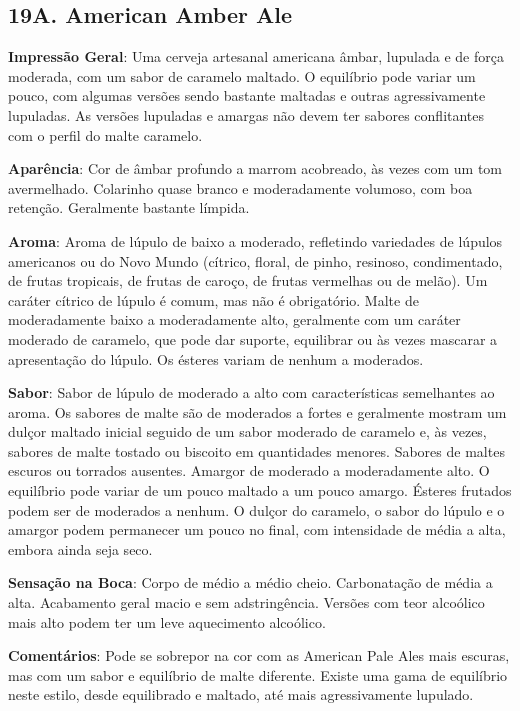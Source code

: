 \subsection*{19A. American Amber Ale}

\textbf{Impressão Geral}: Uma cerveja artesanal americana âmbar, lupulada e de força moderada, com um sabor de caramelo maltado. O equilíbrio pode variar um pouco, com algumas versões sendo bastante maltadas e outras agressivamente lupuladas. As versões lupuladas e amargas não devem ter sabores conflitantes com o perfil do malte caramelo.

\textbf{Aparência}: Cor de âmbar profundo a marrom acobreado, às vezes com um tom avermelhado. Colarinho quase branco e moderadamente volumoso, com boa retenção. Geralmente bastante límpida.

\textbf{Aroma}: Aroma de lúpulo de baixo a moderado, refletindo variedades de lúpulos americanos ou do Novo Mundo (cítrico, floral, de pinho, resinoso, condimentado, de frutas tropicais, de frutas de caroço, de frutas vermelhas ou de melão). Um caráter cítrico de lúpulo é comum, mas não é obrigatório. Malte de moderadamente baixo a moderadamente alto, geralmente com um caráter moderado de caramelo, que pode dar suporte, equilibrar ou às vezes mascarar a apresentação do lúpulo. Os ésteres variam de nenhum a moderados.

\textbf{Sabor}: Sabor de lúpulo de moderado a alto com características semelhantes ao aroma. Os sabores de malte são de moderados a fortes e geralmente mostram um dulçor maltado inicial seguido de um sabor moderado de caramelo e, às vezes, sabores de malte tostado ou biscoito em quantidades menores. Sabores de maltes escuros ou torrados ausentes. Amargor de moderado a moderadamente alto. O equilíbrio pode variar de um pouco maltado a um pouco amargo. Ésteres frutados podem ser de moderados a nenhum. O dulçor do caramelo, o sabor do lúpulo e o amargor podem permanecer um pouco no final, com intensidade de média a alta, embora ainda seja seco.

\textbf{Sensação na Boca}: Corpo de médio a médio cheio. Carbonatação de média a alta. Acabamento geral macio e sem adstringência. Versões com teor alcoólico mais alto podem ter um leve aquecimento alcoólico.

\textbf{Comentários}: Pode se sobrepor na cor com as American Pale Ales mais escuras, mas com um sabor e equilíbrio de malte diferente. Existe uma gama de equilíbrio neste estilo, desde equilibrado e maltado, até mais agressivamente lupulado.

